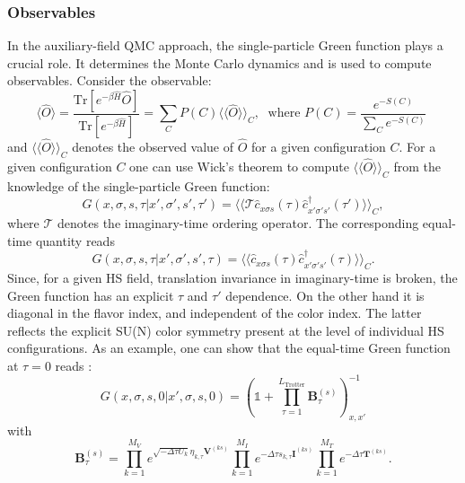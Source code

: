 \subsubsection{Observables}\label{sec:Observables.General}

In the auxiliary-field QMC approach, the single-particle Green function plays a crucial role.  It determines the Monte Carlo dynamics and is used to compute  observables. Consider the observable:
\begin{equation}\label{eqn:obs}
\langle \hat{O}  \rangle  = \frac{ \text{Tr}   \left[ e^{- \beta \hat{H}}  \hat{O}  \right] }{ \text{Tr}   \left[ e^{- \beta \hat{H}}  \right] } =   \sum_{C}   P(C) 
   \langle \langle \hat{O}  \rangle \rangle_{C} ,
   \; \text{ where } 
  P(C)   = \frac{ e^{-S(C)}}{\sum_C e^{-S(C)}}\;
\end{equation}
and $\langle \langle \hat{O}  \rangle \rangle_{C} $ denotes the observed value of $\hat{O}$ for a given configuration $C$.
For a given configuration $C$  one can use Wick's theorem to compute $\langle \langle \hat{O}  \rangle \rangle_{C}$   from the knowledge of the single-particle Green function: 
\begin{equation}
       G( x,\sigma,s, \tau |    x',\sigma',s', \tau')   =       \langle \langle \mathcal{T} \hat{c}^{\phantom\dagger}_{x \sigma s} (\tau)  \hat{c}^{\dagger}_{x' \sigma' s'} (\tau') \rangle \rangle_{C},
\end{equation}
where $ \mathcal{T} $ denotes the imaginary-time ordering operator.   The  corresponding equal-time quantity reads
\begin{equation}
       G( x,\sigma,s, \tau |    x',\sigma',s', \tau)   =       \langle \langle  \hat{c}^{\phantom\dagger}_{x \sigma s} (\tau)  \hat{c}^{\dagger}_{x' \sigma' s'} (\tau) \rangle \rangle_{C}.
\end{equation}
Since, for a given HS field, translation invariance in imaginary-time is broken, the Green function has an explicit $\tau$ and $\tau'$ dependence.   On the other hand it is diagonal in the flavor index, and independent of the color index. The latter reflects the  explicit SU(N) color symmetry present at the level of individual HS configurations.   As an example,  one can show that the equal-time Green function at $\tau = 0$ reads \cite{Assaad08_rev}:
\begin{equation}\label{eqn:Green_eq}
G(x,\sigma,s,0| x',\sigma,s,0 )  =   \left(  \mathds{1}  +  \prod_{\tau = 1}^{L_{\text{Trotter}}}  \bm{B}_{\tau}^{(s)}   \right)^{-1}_{x,x'}
\end{equation}
with
\begin{equation}
\label{Btau.eq}
	\bm{B}_{\tau}^{(s)} =   
    \prod_{k=1}^{M_V}   e^{  \sqrt{ -\Delta \tau  U_k} \eta_{k,\tau} {\bm V}^{(ks)} }   \prod_{k=1}^{M_I}   e^{  -\Delta \tau s_{k,\tau}  {\bm I}^{(ks)}}
    \prod_{k=1}^{M_T}   e^{-\Delta \tau {\bm T}^{(ks)}} .
\end{equation}


